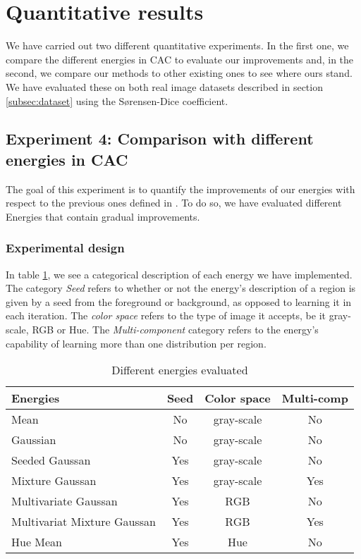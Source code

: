 \section{Quantitative results}
\label{subsec:quantitative_experiment}
We have carried out two different quantitative experiments. In the first one, we compare the different energies in CAC to evaluate our improvements and, in the second, we compare our methods to other existing ones to see where ours stand. We have evaluated these on both real image datasets described in section \ref{subsec:dataset} using the S\o rensen-Dice coefficient. 

\subsection{Experiment 4: Comparison with different energies in CAC}

The goal of this experiment is to quantify the improvements of our energies with respect to the previous ones defined in \cite{ipcac2015}. To do so, we have evaluated different Energies that contain gradual improvements. 

\subsubsection{Experimental design}

In table \ref{table:energy_description}, we see a categorical description of each energy we have implemented. The category \textit{Seed} refers to whether or not the energy's description of a region is given by a seed from the foreground or background, as opposed to learning it in each iteration. The \textit{color space} refers to the type of image it accepts, be it gray-scale, RGB or Hue. The \textit{Multi-component} category refers to the energy's capability of learning more than one distribution per region.

\begin{table}[h!]
	\centering
	\begin{tabular}{|l|c|c|c|}
		\hline
		\textbf{Energies}  & \textbf{Seed} &\textbf{Color space} & \textbf{Multi-comp}   \\ \hline
		Mean  & No & gray-scale & No \\ \hline
		Gaussian & No & gray-scale  & No \\ \hline
		Seeded Gaussan  & Yes & gray-scale & No\\ \hline
		Mixture Gaussan  & Yes & gray-scale & Yes\\ \hline
		Multivariate Gaussan & Yes & RGB & No \\ \hline
		Multivariat Mixture Gaussan & Yes & RGB & Yes \\ \hline
		Hue Mean & Yes & Hue & No \\ \hline
	\end{tabular}
	\caption{Different energies evaluated}
	\label{table:energy_description}
\end{table}

